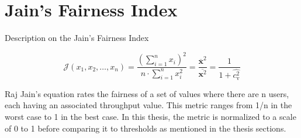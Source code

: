 
\chapter{Jain's Fairness Index} %

\label{AppendixA} %


Description on the Jain's Fairness Index

\begin{equation}
    \mathcal{J}\left(x_{1}, x_{2}, \ldots, x_{n}\right)=\frac{\left(\sum_{i=1}^{n} x_{i}\right)^{2}}{n \cdot \sum_{i=1}^{n} x_{i}^{2}}=\frac{\overline{\mathbf{x}}^{2}}{\overline{\mathbf{x}^{2}}}=\frac{1}{1+\widehat{c_{\mathrm{v}}^{2}}}
    \end{equation}

    Raj Jain's equation rates the fairness of a set of values where there are n users, each having an associated
    throughput value. This metric ranges from 1/n in the worst case to 1 in the best case.
    \newline
    In this thesis, the metric is normalized to a scale of 0 to 1 before comparing it to thresholds as mentioned in
    the thesis sections.